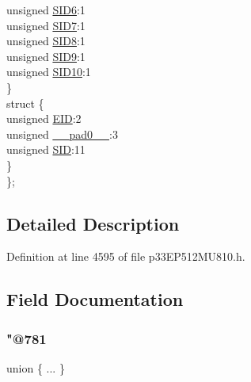 \begin{DoxyCompactItemize}
\begin{tabbing}
\>\>unsigned \hyperlink{structtag_c1_r_x_f15_s_i_d_b_i_t_s_a70d70952133eb2389d5c326f9f0e8035}{SID6}:1\\
\>\>unsigned \hyperlink{structtag_c1_r_x_f15_s_i_d_b_i_t_s_a34097fb76decd431701fa2d86a22328e}{SID7}:1\\
\>\>unsigned \hyperlink{structtag_c1_r_x_f15_s_i_d_b_i_t_s_afe74894633244fdb0b0c01b4e8c522e7}{SID8}:1\\
\>\>unsigned \hyperlink{structtag_c1_r_x_f15_s_i_d_b_i_t_s_a33587704948067005c2a6a3ccc503c99}{SID9}:1\\
\>\>unsigned \hyperlink{structtag_c1_r_x_f15_s_i_d_b_i_t_s_a1a9084031c7f5fb16007feeebf0d8216}{SID10}:1\\
\>\} \\
\>struct \{\\
\>\>unsigned \hyperlink{structtag_c1_r_x_f15_s_i_d_b_i_t_s_ae80b378c9141f7c03e0b4e55b5f4b54d}{EID}:2\\
\>\>unsigned \hyperlink{structtag_c1_r_x_f15_s_i_d_b_i_t_s_adf71f3d8410c1f1dbbc96680a92c49af}{\_\_pad0\_\_}:3\\
\>\>unsigned \hyperlink{structtag_c1_r_x_f15_s_i_d_b_i_t_s_af88edf93b2fee2432665bd84f51287e4}{SID}:11\\
\>\} \\
\}; \\

\end{tabbing}\end{DoxyCompactItemize}


\subsection{Detailed Description}


Definition at line 4595 of file p33\+E\+P512\+M\+U810.\+h.



\subsection{Field Documentation}
\mbox{\label{structtag_c1_r_x_f15_s_i_d_b_i_t_s_a2a88148db1e3e68dc04d389e94d817e8}} 
\subsubsection{\texorpdfstring{"@781}{@781}}
{\footnotesize\ttfamily union \{ ... \} }

\mbox{\label{structtag_c1_r_x_f15_s_i_d_b_i_t_s_adf71f3d8410c1f1dbbc96680a92c49af}} 

